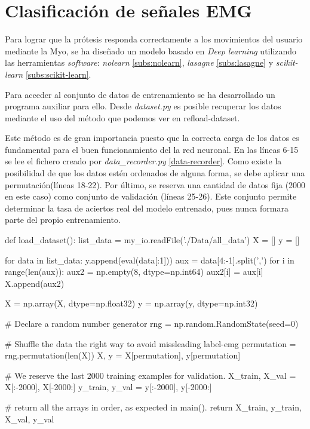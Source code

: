 \section{Clasificación de señales EMG}
\label{sec:clasificación-señales-emg}


Para lograr que la prótesis responda correctamente a los movimientos del usuario mediante la Myo, se ha diseñado
un modelo %
basado en \textit{Deep learning} %
utilizando las herramientas \textit{software}: \textit{nolearn} \ref{subs:nolearn}, \textit{lasagne} \ref{subs:lasagne} y \textit{scikit-learn} \ref{subs:scikit-learn}.



Para acceder al conjunto de datos de entrenamiento se ha desarrollado un programa auxiliar para ello.
Desde \textit{dataset.py} es posible recuperar los datos mediante el uso del método que podemos ver en
ref{load-dataset}.

Este método es de gran importancia puesto que la correcta carga de los datos es fundamental para el buen
funcionamiento del la red neuronal. En las líneas 6-15 se lee el fichero creado por \textit{data\_recorder.py}
\ref{data-recorder}. Como existe la posibilidad de que los datos estén ordenados de alguna forma, se debe aplicar
una permutación(líneas 18-22). Por último, se reserva una cantidad de datos fija (2000 en este caso) como conjunto
de validación (líneas 25-26). Este conjunto permite determinar la tasa de aciertos real del modelo entrenado, pues nunca formara parte del propio entrenamiento.

\begin{python}[frame=none, numbers=left,label={load-dataset}, caption={Método encargado de preparar los conjuntos de validación y entrenamiento para la red neuronal.}]
 def load_dataset():
    list_data = my_io.readFile('./Data/all_data')
    X = []
    y = []

    for data in list_data:
        y.append(eval(data[:1]))
        aux = data[4:-1].split(',')
        for i in range(len(aux)):
            aux2 = np.empty(8, dtype=np.int64)
            aux2[i] = aux[i]
        X.append(aux2)

    X = np.array(X, dtype=np.float32)
    y = np.array(y, dtype=np.int32)

    # Declare a random number generator
    rng = np.random.RandomState(seed=0)

    # Shuffle the data the right way to avoid missleading label-emg
    permutation = rng.permutation(len(X))
    X, y = X[permutation], y[permutation]

    # We reserve the last 2000 training examples for validation.
    X_train, X_val = X[:-2000], X[-2000:]
    y_train, y_val = y[:-2000], y[-2000:]

    # return all the arrays in order, as expected in main().
    return X_train, y_train, X_val, y_val

 \end{python}

